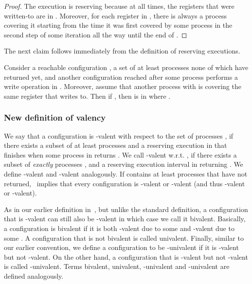 \begin{proof}
The execution is reserving because at all times, the registers that were written-to are in .
Moreover, for each register in , there is always a process covering it
  starting from the time it was first covered by some process  in the second step of some iteration 
  all the way until the end of .
\end{proof}
\noindent The next claim follows immediately from the definition of reserving executions.
\begin{claim}
\label{clm:prefix}
Consider a reachable configuration , a set of at least  processes  none of which have returned yet, 
  and another configuration  reached after some process  performs a write operation  in .  
Moreover, assume that another process  with  is covering the same register that  writes to.
Then if , then  is in  where . 
\end{claim}
\subsubsection{New definition of valency}
We say that a configuration  is -valent with respect to the set of processes ,
  if there exists a subset of at least  processes  and a reserving execution in  
  that finishes when some process in  returns .
We call  -valent w.r.t. , 
  if there exists a subset of \emph{exactly}  processes  ,
  and a reserving execution interval in  returning . 
We define -valent and -valent analogously.
If  contains at least  processes that have not returned,~ implies that 
  every configuration is -valent or -valent (and thus -valent or -valent).



As in our earlier definition in~, but unlike the standard definition,
  a configuration that is -valent can still also be -valent
  in which case we call it bivalent.
Basically, a configuration is bivalent if it is both 
  -valent due to some  and 
  -valent due to some .
A configuration that is not bivalent is called univalent.
Finally, similar to our earlier convention,
  we define a configuration to be -univalent if it is -valent but not -valent.
On the other hand, a configuration that is -valent but not -valent
  is called -univalent.
Terms bivalent, univalent, -univalent and -univalent are defined analogously.

